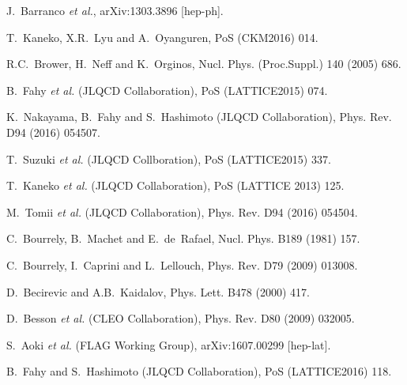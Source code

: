\documentclass{PoS}
\begin{document}

\begin{thebibliography}{99}

J.~Barranco {\it et al.},
arXiv:1303.3896 [hep-ph].

T.~Kaneko, X.R.~Lyu and A.~Oyanguren, 
PoS (CKM2016) 014.

R.C.~Brower, H.~Neff and K.~Orginos,
Nucl. Phys. (Proc.Suppl.) 140 (2005) 686.

B.~Fahy {\it et al.} (JLQCD Collaboration),
PoS (LATTICE2015) 074.

K.~Nakayama, B.~Fahy and S.~Hashimoto (JLQCD Collaboration),
Phys. Rev. D94 (2016) 054507.

T.~Suzuki {\it et al.} (JLQCD Collboration),
PoS (LATTICE2015) 337.

T.~Kaneko {\it et al.} (JLQCD Collaboration),
PoS (LATTICE 2013) 125.

M.~Tomii {\it et al.} (JLQCD Collaboration),
Phys. Rev. D94 (2016) 054504.

C.~Bourrely, B.~Machet and E.~de~Rafael,
Nucl. Phys. B189 (1981) 157.
  
C.~Bourrely, I.~Caprini and L.~Lellouch,
Phys. Rev. D79 (2009) 013008.

D.~Becirevic and A.B.~Kaidalov,
Phys. Lett. B478 (2000) 417.

D.~Besson {\it et al.} (CLEO Collaboration),
Phys. Rev. D80 (2009) 032005.

S.~Aoki {\it et al.} (FLAG Working Group),
arXiv:1607.00299 [hep-lat].

B.~Fahy and S.~Hashimoto (JLQCD Collaboration),
PoS (LATTICE2016) 118.

\end{thebibliography}
\end{document}
